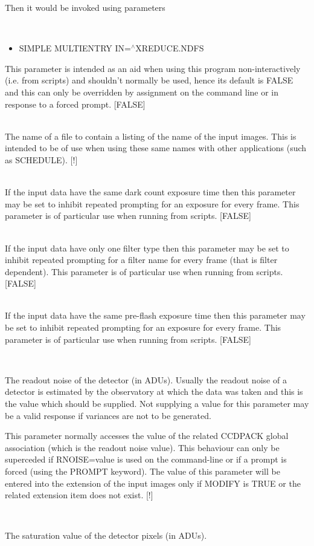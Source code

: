 \documentclass[twoside,11pt]{article}
\newcommand{\htmlref}[2]{#1}
\renewcommand{\_}{\texttt{\symbol{95}}}
\newcommand{\xroutine}[1]{\htmlref{{\sc #1}}{#1}}
\newcommand{\sstsubsection}[1]{ \item[{#1}] \mbox{} \\}
\newcommand{\sstitemlist}[1]{
  \mbox{} \\
  \vspace{-3.5ex}
  \begin{itemize}
     #1
  \end{itemize}
}
\newcommand{\sstitem}{\item}
\newcommand{\sstsubsection}[1]{\item[{#1}]}
\newcommand{\sstitemlist}[1]{
      \begin{itemize}
         #1
      \end{itemize}
      \\
   }
\newcommand{\sstitem}{\item}
\begin{document}
{{{         Then it would be invoked using parameters

         \sstitemlist{

            \sstitem
               SIMPLE MULTIENTRY IN=$^\wedge$XREDUCE.NDFS

         }
         This parameter is intended as an aid when using this program
         non-interactively (i.e. from scripts) and shouldn't normally be
         used, hence its default is FALSE and this can only be
         overridden by assignment on the command line or in response to
         a forced prompt.
         [FALSE]
      }
      \sstsubsection{
         NAMELIST = LITERAL (Read)
      } {
         The name of a file to contain a listing of the name of the
         input images. This is intended to be of use when using these
         same names with other applications (such as \xroutine{SCHEDULE}).
         [!]
      }
      \sstsubsection{
        ONEDARKTIME = \_LOGICAL (Read)
      } {
        If the input data have the same dark count exposure time then
        this parameter may be set to inhibit repeated prompting for an
        exposure for every frame. This parameter is of particular use
        when running from scripts.
        [FALSE]
      }
      \sstsubsection{
          ONEFILTER = \_LOGICAL (Read)
      } {
        If the input data have only one filter type then this parameter
        may be set to inhibit repeated prompting for a filter name
        for every frame (that is filter dependent). This parameter
        is of particular use when running from scripts.
        [FALSE]
      }
      \sstsubsection{
        ONEFLASHTIME = \_LOGICAL (Read)
      } {
        If the input data have the same pre-flash exposure time then
        this parameter may be set to inhibit repeated prompting for an
        exposure for every frame. This parameter is of particular use
        when running from scripts.
        [FALSE]
      }
      \sstsubsection{
         RNOISE = \_DOUBLE (Read)
      } {
         The readout noise of the detector (in ADUs). Usually the
         readout noise of a detector is estimated by the observatory at
         which the data was taken and this is the value which should be
         supplied. Not supplying a value for this parameter may be a
         valid response if variances are not to be generated.

         This parameter normally accesses the value of the related
         CCDPACK global association (which is the readout noise value).
         This behaviour can only be superceded if RNOISE=value is used
         on the command-line or if a prompt is forced (using the
         PROMPT keyword). The value of this parameter will be entered
         into the extension of the input images only if MODIFY is TRUE or
         the related extension item does not exist.
         [!]
      }
      \sstsubsection{
         SATURATION = \_DOUBLE (Read)
      } {
         The saturation value of the detector pixels (in ADUs).

}}}
\end{document}
